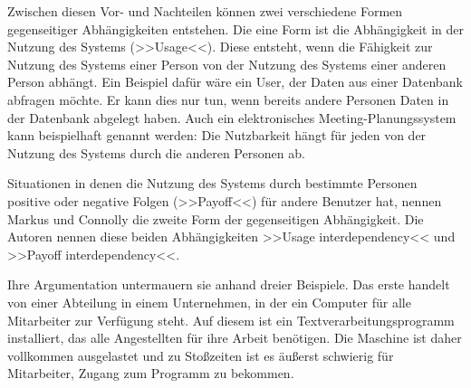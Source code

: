 \medskip Zwischen diesen Vor- und Nachteilen können zwei verschiedene Formen gegenseitiger Abhängigkeiten entstehen. Die eine Form ist die Abhängigkeit in der Nutzung des Systems (>>Usage<<). Diese entsteht, wenn die Fähigkeit zur Nutzung des Systems einer Person von der Nutzung des Systems einer anderen Person abhängt. Ein Beispiel dafür wäre ein User, der Daten aus einer Datenbank abfragen möchte. Er kann dies nur tun, wenn bereits andere Personen Daten in der Datenbank abgelegt haben. Auch ein elektronisches Meeting-Planungssystem kann beispielhaft genannt werden: Die Nutzbarkeit hängt für jeden von der Nutzung des Systems durch die anderen Personen ab. 

	Situationen in denen die Nutzung des Systems durch bestimmte Personen positive oder negative Folgen (>>Payoff<<) für andere Benutzer hat, nennen Markus und Connolly die zweite Form der gegenseitigen Abhängigkeit. Die Autoren nennen diese beiden Abhängigkeiten >>Usage interdependency<< und >>Payoff interdependency<<.
	
	\medskip Ihre Argumentation untermauern sie anhand dreier Beispiele. Das erste handelt von einer Abteilung in einem Unternehmen, in der ein Computer für alle Mitarbeiter zur Verfügung steht. Auf diesem ist ein Textverarbeitungsprogramm installiert, das alle Angestellten für ihre Arbeit benötigen. Die Maschine ist daher vollkommen ausgelastet und zu Stoßzeiten ist es äußerst schwierig für Mitarbeiter, Zugang zum Programm zu bekommen. 
	
